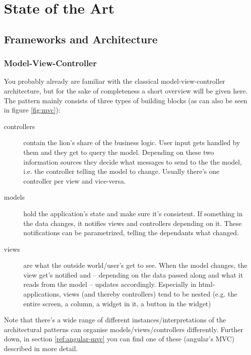 
\chapter{State of the Art}

\section{Frameworks and Architecture}

\subsection{Model-View-Controller}

You probably already are familiar with the classical model-view-controller architecture, but for the sake of completeness a short overview will be given here. The pattern mainly consists of three types of building blocks (as can also be seen in figure \ref{fig:mvc}):

\begin{description}
  \item[controllers] contain the lion's share of the business logic. User input gets handled by them and they get to query the model. Depending on these two information sources they decide what messages to send to the the model, i.e. the controller telling the model to change. Usually there's one controller per view and vice-versa.
  \item[models] hold the application's state and make sure it's consistent. If something in the data changes, it notifies views and controllers depending on it. These notifications can be parametrized, telling the dependants what changed.
  \item[views] are what the outside world/user's get to see. When the model changes, the view get's notified and -- depending on the data passed along and what it reads from the model --  updates accordingly.
  Especially in html-applications, views (and thereby controllers) tend to be nested (e.g. the entire screen, a column, a widget in it, a button in the widget)
\end{description}

Note that there's a wide range of different instances/interpretations of the architectural patterns can organise models/views/controllers differently. Further down, in section \ref{ref:angular-mvc} you can find one of these (angular's MVC) described in more detail.


